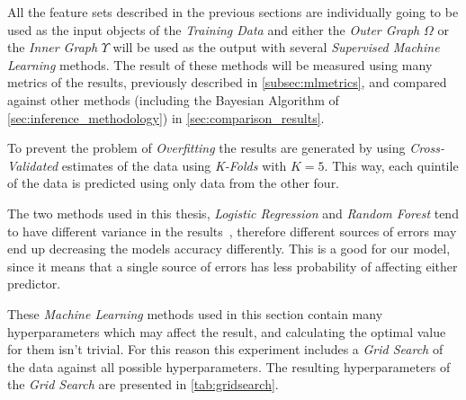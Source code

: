 All the feature sets described in the previous sections are individually going to be used as the input objects of the \emph{Training Data} and either the \emph{Outer Graph} $\Omega$ or the \emph{Inner Graph} $\Upsilon$ will be used as the output with several \emph{Supervised Machine Learning} methods. The result of these methods will be measured using many metrics of the results, previously described in \cref{subsec:mlmetrics}, and compared against other methods (including the Bayesian Algorithm of \cref{sec:inference_methodology}) in \cref{sec:comparison_results}.

To prevent the problem of \emph{Overfitting} the results are generated by using \emph{Cross-Validated} estimates of the data using \emph{K-Folds} with $K = 5$. This way, each quintile of the data is predicted using only data from the other four.

The two methods used in this thesis, \emph{Logistic Regression} and \emph{Random Forest} tend to have different variance in the results~\cite{ting2016}, therefore different sources of errors may end up decreasing the models accuracy differently. This is a good for our model, since it means that a single source of errors has less probability of affecting either predictor.

These \emph{Machine Learning} methods used in this section contain many hyperparameters which may affect the result, and calculating the optimal value for them isn't trivial. For this reason this experiment includes a \emph{Grid Search} of the data against all possible hyperparameters. The resulting hyperparameters of the \emph{Grid Search} are presented in \cref{tab:gridsearch}.

